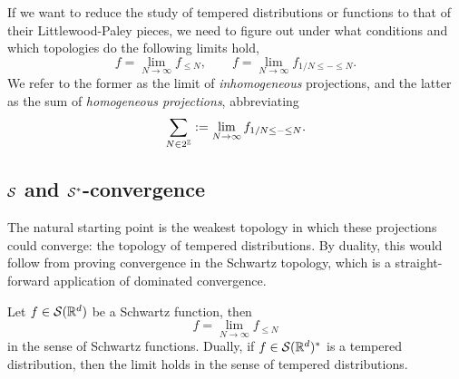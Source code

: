 If we want to reduce the study of tempered distributions or functions to that of their Littlewood-Paley pieces, we need to figure out under what conditions and which topologies do the following limits hold, 
	\[ f = \lim_{N \to \infty} f_{\leq N} , \qquad f = \lim_{N \to \infty} f_{1/N \leq - \leq N} . \]
We refer to the former as the limit of  \textit{inhomogeneous} projections, and the latter as the sum of \textit{homogeneous projections}, abbreviating
	\[ \sum_{N \in 2^\mathbb Z} := \lim_{N \to \infty} f_{1/N \leq - \leq N}. \]


\subsection{$\mathcal S$ and $\mathcal S^*$-convergence}

The natural starting point is the weakest topology in which these projections could converge: the topology of tempered distributions. By duality, this would follow from proving convergence in the Schwartz topology, which is a straight-forward application of dominated convergence. 

\begin{proposition}
	Let $f \in \mathcal S (\mathbb R^d)$ be a Schwartz function, then 
		\[ f = \lim_{N \to \infty} f_{\leq N} \]
	in the sense of Schwartz functions. Dually, if $f \in \mathcal S (\mathbb R^d)^*$ is a tempered distribution, then the limit holds in the sense of tempered distributions. 
\end{proposition}

